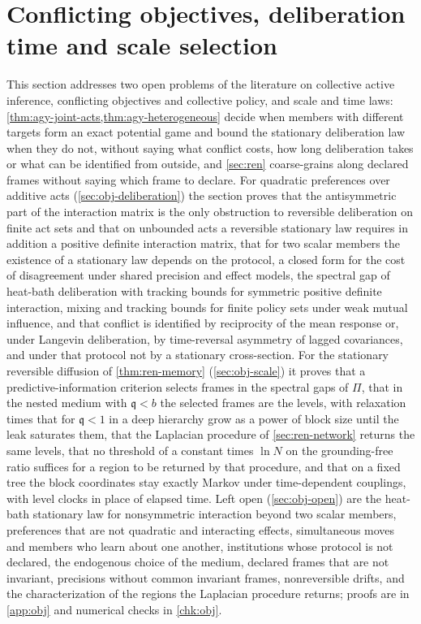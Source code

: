 \section{Conflicting objectives, deliberation time and scale selection}\label{sec:obj}

This section addresses two open problems of the literature on collective active inference, conflicting objectives and collective policy, and scale and time laws: \cref{thm:agy-joint-acts,thm:agy-heterogeneous} decide when members with different targets form an exact potential game and bound the stationary deliberation law when they do not, without saying what conflict costs, how long deliberation takes or what can be identified from outside, and \cref{sec:ren} coarse-grains along declared frames without saying which frame to declare. For quadratic preferences over additive acts (\cref{sec:obj-deliberation}) the section proves that the antisymmetric part of the interaction matrix is the only obstruction to reversible deliberation on finite act sets and that on unbounded acts a reversible stationary law requires in addition a positive definite interaction matrix, that for two scalar members the existence of a stationary law depends on the protocol, a closed form for the cost of disagreement under shared precision and effect models, the spectral gap of heat-bath deliberation with tracking bounds for symmetric positive definite interaction, mixing and tracking bounds for finite policy sets under weak mutual influence, and that conflict is identified by reciprocity of the mean response or, under Langevin deliberation, by time-reversal asymmetry of lagged covariances, and under that protocol not by a stationary cross-section. For the stationary reversible diffusion of \cref{thm:ren-memory} (\cref{sec:obj-scale}) it proves that a predictive-information criterion selects frames in the spectral gaps of $\Pi$, that in the nested medium with $\mathfrak q<b$ the selected frames are the levels, with relaxation times that for $\mathfrak q<1$ in a deep hierarchy grow as a power of block size until the leak saturates them, that the Laplacian procedure of \cref{sec:ren-network} returns the same levels, that no threshold of a constant times $\ln N$ on the grounding-free ratio suffices for a region to be returned by that procedure, and that on a fixed tree the block coordinates stay exactly Markov under time-dependent couplings, with level clocks in place of elapsed time. Left open (\cref{sec:obj-open}) are the heat-bath stationary law for nonsymmetric interaction beyond two scalar members, preferences that are not quadratic and interacting effects, simultaneous moves and members who learn about one another, institutions whose protocol is not declared, the endogenous choice of the medium, declared frames that are not invariant, precisions without common invariant frames, nonreversible drifts, and the characterization of the regions the Laplacian procedure returns; proofs are in \cref{app:obj} and numerical checks in \cref{chk:obj}.

